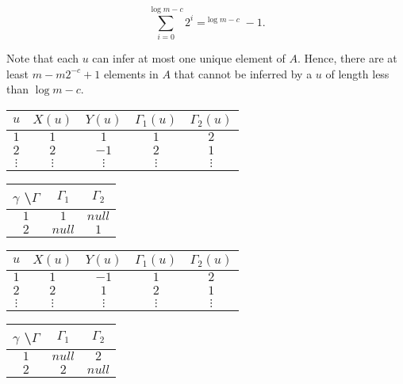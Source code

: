 \documentclass[11pt]{article}
\begin{document}
$$ \sum_{i = 0}^{\log m - c} {2^i} = ^{\log m - c} - 1. $$ 

Note that each $ u $ can infer at most one unique element of $ A $. Hence, there are at least $ m - m2^{-c} + 1 $ elements in $ A $ that cannot be inferred by a $ u $ of length less than $ \log m - c $. \\


\begin{center}
 \begin{tabular}{ |c||c|c|c|c| } 

 \hline
 $ u $ & $ X(u) $ & $ Y(u) $ & $ \Gamma_1(u) $ & $ \Gamma_2(u) $ \\ 
 \hline
 \hline
 $ 1 $ & $ 1 $ & $ 1 $ & $ 1 $ & $ 2 $ \\
 \hline
 $ 2 $ & $ 2 $ & $ -1 $ & $ 2 $ & $ 1 $ \\
 \hline
 $ \vdots $ & $ \vdots $ & $ \vdots $ & $ \vdots $ & $ \vdots $ \\
 \hline
 \end{tabular} 
 \quad
 \begin{tabular}{ |c||c|c| } 
 \hline
 $ \gamma $ \textbackslash $ \Gamma $ & $ \Gamma_1 $ & $ \Gamma_2 $ \\ 
 \hline
 \hline
 $ 1 $ & $ 1 $ & $ null $  \\
  \hline
 $ 2 $ & $ null $ & $ 1 $  \\
 \hline
 
 \end{tabular}
 \end{center} 

\begin{center}
 \begin{tabular}{ |c||c|c|c|c| } 

 \hline
 $ u $ & $ X(u) $ & $ Y(u) $ & $ \Gamma_1(u) $ & $ \Gamma_2(u) $ \\ 
 \hline
 \hline
 $ 1 $ & $ 1 $ & $ -1 $ & $ 1 $ & $ 2 $ \\
 \hline
 $ 2 $ & $ 2 $ & $ 1 $ & $ 2 $ & $ 1 $ \\
 \hline
 $ \vdots $ & $ \vdots $ & $ \vdots $ & $ \vdots $ & $ \vdots $ \\
 \hline
 \end{tabular} 
 \quad
 \begin{tabular}{ |c||c|c| } 
 \hline
 $ \gamma $ \textbackslash $ \Gamma $ & $ \Gamma_1 $ & $ \Gamma_2 $ \\ 
 \hline
 \hline
 $ 1 $ & $ null $ & $ 2 $  \\
  \hline
 $ 2 $ & $ 2 $ & $ null $  \\
 \hline
 
 \end{tabular}
 \end{center} 



\end{document}
